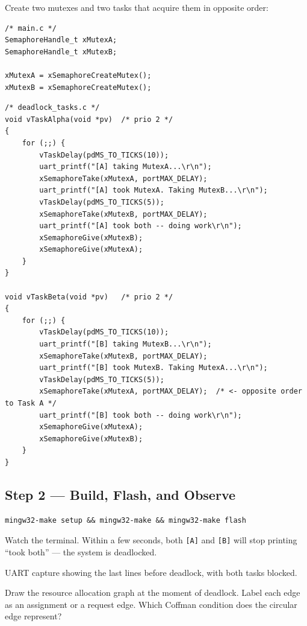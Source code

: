 \documentclass[11pt, a4paper]{article}
\begin{document}
Create two mutexes and two tasks that acquire them in opposite order:

\begin{lstlisting}[style=cstyle]
/* main.c */
SemaphoreHandle_t xMutexA;
SemaphoreHandle_t xMutexB;

xMutexA = xSemaphoreCreateMutex();
xMutexB = xSemaphoreCreateMutex();
\end{lstlisting}

\begin{lstlisting}[style=cstyle]
/* deadlock_tasks.c */
void vTaskAlpha(void *pv)  /* prio 2 */
{
    for (;;) {
        vTaskDelay(pdMS_TO_TICKS(10));
        uart_printf("[A] taking MutexA...\r\n");
        xSemaphoreTake(xMutexA, portMAX_DELAY);
        uart_printf("[A] took MutexA. Taking MutexB...\r\n");
        vTaskDelay(pdMS_TO_TICKS(5));
        xSemaphoreTake(xMutexB, portMAX_DELAY);
        uart_printf("[A] took both -- doing work\r\n");
        xSemaphoreGive(xMutexB);
        xSemaphoreGive(xMutexA);
    }
}

void vTaskBeta(void *pv)   /* prio 2 */
{
    for (;;) {
        vTaskDelay(pdMS_TO_TICKS(10));
        uart_printf("[B] taking MutexB...\r\n");
        xSemaphoreTake(xMutexB, portMAX_DELAY);
        uart_printf("[B] took MutexB. Taking MutexA...\r\n");
        vTaskDelay(pdMS_TO_TICKS(5));
        xSemaphoreTake(xMutexA, portMAX_DELAY);  /* <- opposite order to Task A */
        uart_printf("[B] took both -- doing work\r\n");
        xSemaphoreGive(xMutexA);
        xSemaphoreGive(xMutexB);
    }
}
\end{lstlisting}

\subsection{Step 2 --- Build, Flash, and Observe}

\begin{lstlisting}[style=bashstyle]
mingw32-make setup && mingw32-make && mingw32-make flash
\end{lstlisting}

Watch the terminal. Within a few seconds, both \texttt{[A]} and \texttt{[B]} will stop
printing ``took both'' --- the system is deadlocked.

\begin{checkpointbox}[~A]
  UART capture showing the last lines before deadlock, with both tasks blocked.
\end{checkpointbox}

\begin{questionbox}[~A1]
  Draw the resource allocation graph at the moment of deadlock. Label each edge as an
  assignment or a request edge. Which Coffman condition does the circular edge represent?
\end{questionbox}
\end{document}
